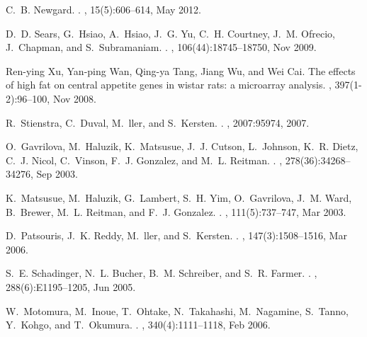 \documentclass[
]{article}
\begin{document}
\begin{thebibliography}{100}
C.~B. Newgard.
.
, 15(5):606--614, May 2012.

D.~D. Sears, G.~Hsiao, A.~Hsiao, J.~G. Yu, C.~H. Courtney, J.~M. Ofrecio,
  J.~Chapman, and S.~Subramaniam.
.
, 106(44):18745--18750, Nov 2009.

Ren-ying Xu, Yan-ping Wan, Qing-ya Tang, Jiang Wu, and Wei Cai.
\newblock The effects of high fat on central appetite genes in wistar rats: a
  microarray analysis.
, 397(1-2):96--100, Nov 2008.

R.~Stienstra, C.~Duval, M.~ller, and S.~Kersten.
.
, 2007:95974, 2007.

O.~Gavrilova, M.~Haluzik, K.~Matsusue, J.~J. Cutson, L.~Johnson, K.~R. Dietz,
  C.~J. Nicol, C.~Vinson, F.~J. Gonzalez, and M.~L. Reitman.
.
, 278(36):34268--34276, Sep 2003.

K.~Matsusue, M.~Haluzik, G.~Lambert, S.~H. Yim, O.~Gavrilova, J.~M. Ward,
  B.~Brewer, M.~L. Reitman, and F.~J. Gonzalez.
.
, 111(5):737--747, Mar 2003.

D.~Patsouris, J.~K. Reddy, M.~ller, and S.~Kersten.
.
, 147(3):1508--1516, Mar 2006.

S.~E. Schadinger, N.~L. Bucher, B.~M. Schreiber, and S.~R. Farmer.
.
, 288(6):E1195--1205, Jun 2005.

W.~Motomura, M.~Inoue, T.~Ohtake, N.~Takahashi, M.~Nagamine, S.~Tanno,
  Y.~Kohgo, and T.~Okumura.
.
, 340(4):1111--1118, Feb 2006.


\end{thebibliography}
\end{document}
